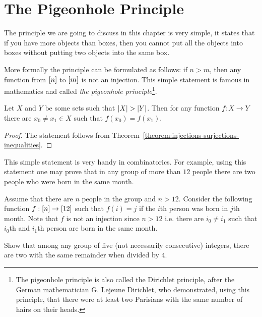 \chapter{The Pigeonhole Principle}
\label{chapter:pigeonhole}

The principle we are going to discuss in this chapter is very simple, it states
that if you have more objects than boxes, then you cannot put all the objects into
boxes without putting two objects into the same box.

More formally the principle can be formulated as follows: if $n > m$, then any
function from ${[{n}]}$ to ${[{m}]}$ is not an injection. This simple
statement is famous in mathematics and called 
\emph{the pigeonhole principle}\footnote{%
  The pigeonhole principle is also called the Dirichlet principle, after the
  German mathematician G. Lejeune Dirichlet, who demonstrated, using this
  principle, that there were at least two Parisians with the same number of
  hairs on their heads.
}.

\begin{theorem}
  Let $X$ and $Y$ be some sets such that $\left|{X}\right| > \left|{Y}\right|$.
  Then for any function $f : X \to Y$ there are $x_0 \neq x_1 \in X$ such that
  $f(x_0) = f(x_1)$.
\end{theorem}
\begin{proof}
  The statement follows from
  Theorem~\ref{theorem:injections-surjections-inequalities}.
\end{proof}

This simple statement is very handy in combinatorics. For example, using this
statement one may prove that in any group of more than $12$ people there are
two people who were born in the same month.

Assume that there are $n$ people in the group and $n > 12$.
Consider the following function $f : {[{n}]} \to {[{12}]}$ such that $f(i) = j$ if the
$i$th person was born in $j$th month. Note that $f$ is not an injection since
$n > 12$ i.e. there are $i_0 \neq i_1$ such that $i_0$th and $i_1$th person are
born in the same month.

\begin{exercise}
  Show that among any group of five (not necessarily consecutive)
  integers, there are two with the same remainder when divided by $4$.
\end{exercise}

